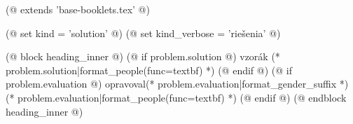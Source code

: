 (@ extends 'base-booklets.tex' @)

(@ set kind = 'solution' @)
(@ set kind_verbose = 'riešenia' @)

(@ block heading_inner @)
    (@ if problem.solution @)%
        vzorák (* problem.solution|format_people(func=textbf) *)%
    (@ endif @)%
    (@ if problem.evaluation @)%
        opravoval(* problem.evaluation|format_gender_suffix *) (* problem.evaluation|format_people(func=textbf) *)%
    (@ endif @)%
(@ endblock heading_inner @)
